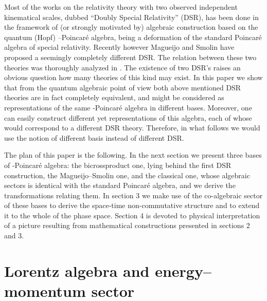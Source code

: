 \documentclass[a4paper,a4paper]{article}
\begin{document}
Most of the works on the relativity theory with two observed
independent kinematical scales,   dubbed ``Doubly Special
Relativity'' (DSR), has been done  in the framework of (or
strongly motivated by) algebraic construction based on the quantum
(Hopf) \myHighlight{$\kappa$}\coordHE{}--Poincar\'e algebra, being a deformation of the
standard Poincar\'e algebra of special relativity. Recently
however Magueijo and Smolin \cite{JoaoLee} have proposed a
seemingly completely different DSR. The relation between these two
theories was thoroughly analyzed in \cite{gacandstud}. The
existence of two DSR's raises an obvious question  how many
theories of this kind may exist. In this paper we show that from
the quantum algebraic point of view both above mentioned DSR
theories are in fact completely equivalent, and might be
considered as  representations of the same \myHighlight{$\kappa$}\coordHE{}-Poincar\'e
algebra in different bases. Moreover, one can easily construct
different yet representations of this algebra, each of whose would
correspond to a different DSR theory. Therefore, in what follows
we would use the notion of different basis instead of different
DSR.

The plan of this paper is the following. In the next section we
present three bases of \myHighlight{$\kappa$}\coordHE{}-Poincar\'e algebra:  the
bicrossproduct one, lying behind the first DSR construction, the
Magueijo--Smolin one, and the classical one, whose algebraic
sectors is identical with the standard Poincar\'e algebra, and we
derive the transformations relating them. In section 3 we make use
of the co-algebraic sector of these bases to derive the space-time
non-commutative structure and to extend it to the whole of the
phase space. Section 4 is devoted to physical interpretation of a
picture resulting from mathematical constructions presented in
sections 2 and 3.

\section{Lorentz algebra and energy--momentum sector}
\end{document}
